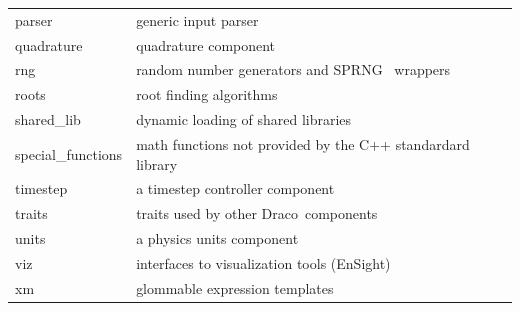 \documentclass[note]{ResearchNote}
\newcommand{\draco}{Draco}
\newcommand{\tableText}[1]{{\raggedright #1}}
\begin{document}
\begin{center}
\begin{tabular}{lp{4.0in}}
    \textsf{parser}       & \tableText{generic input parser} \\
    \textsf{quadrature}   & \tableText{quadrature component} \\
    \textsf{rng}          & \tableText{random number generators and SPRNG~\cite{ce97} wrappers} \\
    \textsf{roots}        & \tableText{root finding algorithms} \\
    \textsf{shared\_lib}  & \tableText{dynamic loading of shared libraries} \\
    \textsf{special\_functions} & \tableText{math functions not provided by the
      C++ standardard library} \\
    \textsf{timestep}     & \tableText{a timestep controller component} \\
    \textsf{traits}       & \tableText{traits used by other \draco\ components} \\
    \textsf{units}        & \tableText{a physics units component} \\
    \textsf{viz}          & \tableText{interfaces to visualization tools (EnSight)} \\
    \textsf{xm}           & \tableText{glommable expression templates~\cite{fu97}} \\   
    \hline\hline 
  \end{tabular}
\end{center}
\end{document}
